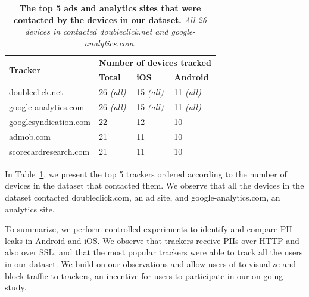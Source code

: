 \begin{table}
\centering
\begin{small}
\begin{tabular}{|p{}|p{}|p{}|p{}|}
\hline
\multirow{2}{*}{\bf Tracker} & \multicolumn{3}{c|}{\bf Number of devices tracked}\tabularnewline
\cline{2-4}
                      &  {\bf Total} & {\bf iOS} & {\bf Android} \tabularnewline
\hline
doubleclick.net       & 26 {\em(all)} & 15 {\em(all)} & 11 {\em(all)} \tabularnewline
\hline
google-analytics.com  & 26 {\em(all)} & 15 {\em(all)}  & 11 {\em(all)} \tabularnewline
\hline
googlesyndication.com & 22 & 12 & 10 \tabularnewline
\hline
admob.com             & 21 & 11 & 10 \tabularnewline
\hline
scorecardresearch.com &  21 & 11 & 10 \tabularnewline
\hline
\end{tabular}
\end{small}
\caption{\textbf{The top 5 ads and analytics sites that were contacted by the devices in our dataset.}
\emph{All 26 devices in} \mobWild \emph{contacted doubleclick.net and google-analytics.com}.}
\vspace{\postfigspace}
\label{tab:top-trackers}
\end{table}

In Table~\ref{tab:top-trackers}, we present the top 5 trackers ordered according to the number of devices in the \mobWild dataset that contacted them.
We observe that all the devices in the \mobWild dataset contacted doubleclick.com, an ad site, and google-analytics.com, an analytics site. 

To summarize, we perform controlled experiments to identify and compare PII leaks in Android and iOS. 
We observe that trackers receive PIIs over HTTP and also over SSL, and that the most popular trackers were able to track all the users in our \mobWild dataset.
We build on our observations and allow users of \meddle to visualize and block traffic to trackers, an incentive for users to participate in our on going study. 



